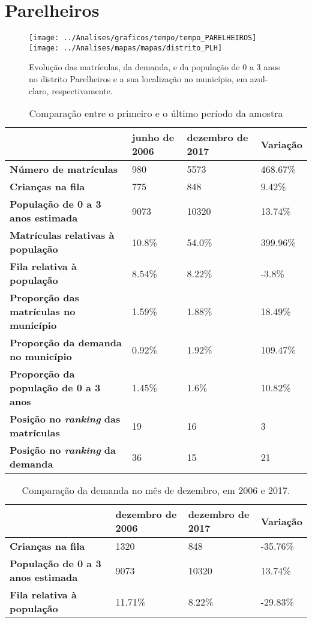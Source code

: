\section{Parelheiros}
\begin{figure}[H]
\centering
\texttt{[image: ../Analises/graficos/tempo/tempo\_PARELHEIROS]}
\texttt{[image: ../Analises/mapas/mapas/distrito\_PLH]}
\caption{Evolução das matrículas, da demanda, e da população de 0 a 3 anos no distrito Parelheiros e a sua localização no município, em azul-claro, respectivamente.}
\end{figure}
\begin{table}[H]
\begin{tabular}{l|l|l|l}
\textbf{}                                      & \textbf{junho de 2006}       & \textbf{dezembro de 2017}    & \textbf{Variação} \\ \hline
\textbf{Número de matrículas}                  & 980 & 5573 & 468.67\% \\ \hline
\textbf{Crianças na fila}                      & 775 & 848 & 9.42\% \\ \hline
\textbf{População de 0 a 3 anos estimada}      & 9073 & 10320 & 13.74\% \\ \hline
\textbf{Matrículas relativas à população}      & 10.8\% & 54.0\% & 399.96\% \\ \hline
\textbf{Fila relativa à população}             & 8.54\% & 8.22\% & -3.8\% \\ \hline
\textbf{Proporção das matrículas no município} & 1.59\% & 1.88\% & 18.49\% \\ \hline
\textbf{Proporção da demanda no município}     & 0.92\% & 1.92\% & 109.47\% \\ \hline
\textbf{Proporção da população de 0 a 3 anos}  & 1.45\% & 1.6\% & 10.82\% \\ \hline
\textbf{Posição no \textit{ranking} das matrículas}     & 19 & 16 & 3 \\ \hline
\textbf{Posição no \textit{ranking} da demanda}         & 36 & 15 & 21 \\ 
\end{tabular}
\caption{Comparação entre o primeiro e o último período da amostra}
\end{table}
\begin{table}[H]
\begin{tabular}{l|l|l|l}
\textbf{}                                 & \textbf{dezembro de 2006} & \textbf{dezembro de 2017} & \textbf{Variação} \\ \hline
\textbf{Crianças na fila}                      & 1320 & 848 & -35.76\% \\ \hline
\textbf{População de 0 a 3 anos estimada}      & 9073 & 10320 & 13.74\% \\ \hline
\textbf{Fila relativa à população}             & 11.71\% & 8.22\% & -29.83\% \\
\end{tabular}
\caption{Comparação da demanda no mês de dezembro, em 2006 e 2017.}
\end{table}
